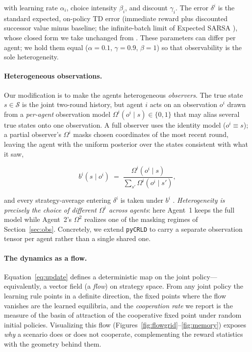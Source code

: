 \documentclass{article}
\begin{document}
with learning rate $\alpha_i$, choice intensity $\beta_i$, and discount $\gamma_i$. The error $\delta^i$ is the standard expected, on-policy TD error (immediate reward plus discounted successor value minus baseline; the infinite-batch limit of Expected SARSA \cite{13}), whose closed form we take unchanged from \cite{14, 15}. These parameters can differ per agent; we hold them equal ($\alpha=0.1$, $\gamma=0.9$, $\beta=1$) so that observability is the sole heterogeneity.

\paragraph{Heterogeneous observations.}
Our modification is to make the agents heterogeneous \emph{observers}. The true state $s\in\mathcal{S}$ is the joint two-round history, but agent $i$ acts on an observation $o^i$ drawn from a \emph{per-agent} observation model $\Omega^i(o^i\mid s)\in\{0,1\}$ that may alias several true states onto one observation. A full observer uses the identity model ($o^i\equiv s$); a partial observer's $\Omega^i$ masks chosen coordinates of the most recent round, leaving the agent with the uniform posterior over the states consistent with what it saw,

\begin{equation}
b^i(s\mid o^i) \;=\; \frac{\Omega^i(o^i\mid s)}{\sum_{s'}\Omega^i(o^i\mid s')},
\label{eq:belief}
\end{equation}

and every strategy-average entering $\delta^i$ is taken under $b^i$ \cite{15}. \emph{Heterogeneity is precisely the choice of different $\Omega^i$ across agents}: here Agent~1 keeps the full model while Agent~2's $\Omega^2$ realizes one of the masking regimes of Section~\ref{sec:obs}. Concretely, we extend \texttt{pyCRLD} to carry a separate observation tensor per agent rather than a single shared one.

\paragraph{The dynamics as a flow.}
Equation~\eqref{eq:update} defines a deterministic map on the joint policy---equivalently, a vector field (a \emph{flow}) on strategy space. From any joint policy the learning rule points in a definite direction, the fixed points where the flow vanishes are the learned equilibria, and the \emph{cooperation rate} we report is the measure of the basin of attraction of the cooperative fixed point under random initial policies. Visualizing this flow (Figures~\ref{fig:flowgrid}--\ref{fig:memory}) exposes \emph{why} a scenario does or does not cooperate, complementing the reward statistics with the geometry behind them.
\end{document}
